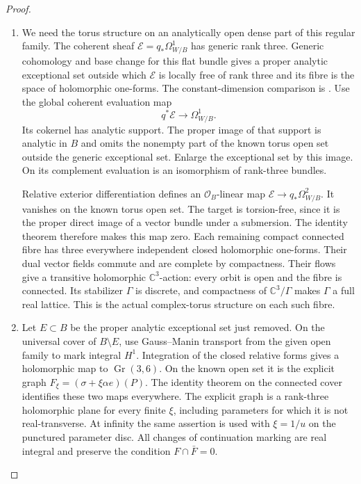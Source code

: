 \begin{proof}
\begin{enumerate}[label=\arabic*.]
\item We need the torus structure on an analytically open dense
part of this regular family.  The coherent sheaf
$\mathcal E=q_*\Omega^1_{W/B}$ has generic rank three.
Generic cohomology and base change for this flat bundle gives
a proper analytic exceptional set outside which $\mathcal E$
is locally free of rank three and its fibre is the space of
holomorphic one-forms.  The constant-dimension comparison is
\cite[\S7, Satz 5, pp.~63--64]{Grauert60}.
Use the global coherent evaluation map
\[
 q^*\mathcal E\longrightarrow\Omega^1_{W/B}.
\]
Its cokernel has analytic support.  The proper image of that
support is analytic in $B$ and omits the nonempty part of the
known torus open set outside the generic exceptional set.
Enlarge the exceptional set by this image.  On its complement
evaluation is an isomorphism of rank-three bundles.

Relative exterior differentiation defines an
$\mathcal O_B$-linear map
$\mathcal E\to q_*\Omega^2_{W/B}$.  It vanishes on the known
torus open set.  The target is torsion-free, since it is the
proper direct image of a vector bundle under a submersion.
The identity theorem therefore makes this map zero.  Each
remaining compact connected fibre has three everywhere
independent closed holomorphic one-forms.  Their dual vector
fields commute and are complete by compactness.  Their flows
give a transitive holomorphic $\mathbb C^3$-action: every orbit
is open and the fibre is connected.  Its stabilizer $\Gamma$
is discrete, and compactness of $\mathbb C^3/\Gamma$ makes
$\Gamma$ a full real lattice.  This is the actual complex-torus
structure on each such fibre.

\item Let $E\subset B$ be the proper analytic exceptional set just
removed.  On the universal cover of $B\setminus E$, use
Gauss--Manin transport from the given open family to mark
integral $H^1$.  Integration of the closed relative forms
gives a holomorphic map to $\operatorname{Gr}(3,6)$.  On the
known open set it is the explicit graph
$F_\xi=(\sigma+\xi\alpha e)(P)$.  The identity theorem on the
connected cover identifies these two maps everywhere.
The explicit graph is a rank-three holomorphic plane for
every finite $\xi$, including parameters for which it is not
real-transverse.  At infinity the same assertion is used with
$\xi=1/u$ on the punctured parameter disc.  All changes of
continuation marking are real integral and preserve the
condition $F\cap\bar F=0$.


\end{enumerate}
\end{proof}
